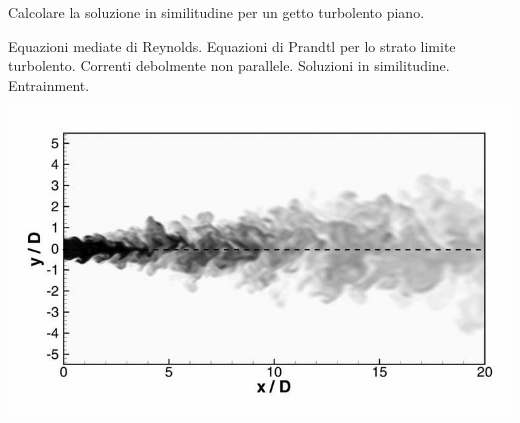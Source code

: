\begin{minipage}[l]{0.55\textwidth}
 \begin{exerciseS}
  Calcolare la soluzione in similitudine per un getto turbolento piano.

 \end{exerciseS}

\partone
 Equazioni mediate di Reynolds. Equazioni di Prandtl per lo strato
 limite turbolento. Correnti debolmente non parallele. Soluzioni in
 similitudine. Entrainment.
%      

\end{minipage}
\hspace{3mm}
\begin{minipage}[r]{0.45\textwidth}
  \centering
  \vspace{5mm}
  \includegraphics[width=1.0\textwidth]{./fig/turbulentJet}
\end{minipage}


